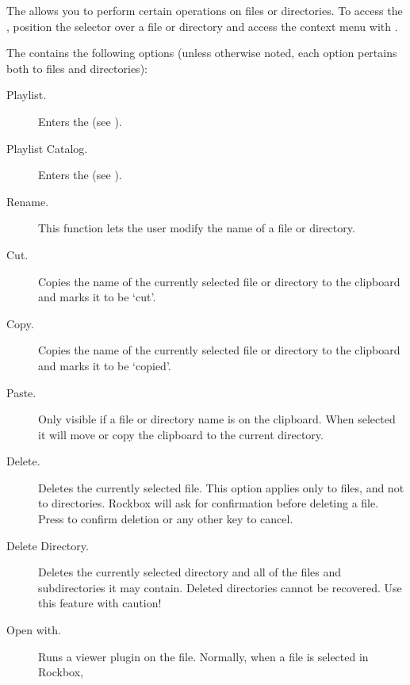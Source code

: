 The  allows you to perform certain operations on files or 
directories.  To access the , position the selector over a file 
or directory and access the context menu with \ActionStdContext{}.


The  contains the following options (unless otherwise noted, 
each option pertains both to files and directories):

\begin{description}
\item [Playlist.]
  Enters the  (see ).
\item [Playlist Catalog.]
  Enters the  (see 
  ).
\item [Rename.]
  This function lets the user modify the name of a file or directory.
\item [Cut.]
  Copies the name of the currently selected file or directory to the clipboard
  and marks it to be `cut'.
\item [Copy.]
  Copies the name of the currently selected file or directory to the clipboard
  and marks it to be `copied'.
\item [Paste.]
  Only visible if a file or directory name is on the clipboard. When selected
  it will move or copy the clipboard to the current directory.
\item [Delete.]
  Deletes the currently selected file. This option applies only to files, and
  not to directories. Rockbox will ask for confirmation before deleting a file.
  Press \ActionYesNoAccept{}
  to confirm deletion or any other key to cancel.
\item [Delete Directory.]
  Deletes the currently selected directory and all of the files and subdirectories
  it may contain. Deleted directories cannot be recovered. Use this feature with
  caution!
\item [Open with.]
  Runs a viewer plugin on the file. Normally, when a file is selected in Rockbox,

\end{description}
